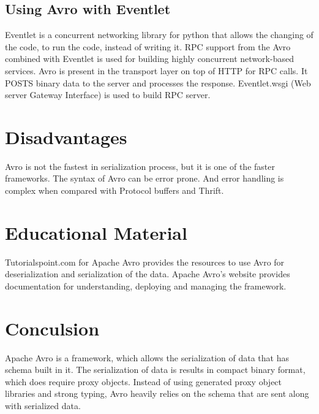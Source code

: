 \documentclass[9pt,twocolumn,twoside]{../../styles/osajnl}
\begin{document}
\subsection{Using Avro with Eventlet}

Eventlet\cite{www-using-avro} is a concurrent networking library for
python that allows the changing of the code, to run the code, instead
of writing it.  RPC support from the Avro combined with Eventlet is
used for building highly concurrent network-based services. Avro is
present in the transport layer on top of HTTP for RPC calls. It POSTS
binary data to the server and processes the response. Eventlet.wsgi
(Web server Gateway Interface) is used to build RPC server.

\section{Disadvantages}

Avro is not the fastest in serialization process, but it is one of the
faster frameworks.  The syntax of Avro can be error prone. And error
handling is complex when compared with Protocol buffers and Thrift.

\section{Educational Material}

Tutorialspoint.com \cite{www-tutorialspoint-avro}for Apache Avro
provides the resources to use Avro for deserialization and
serialization of the data.  Apache Avro’s \cite{www-apache-avro}
website provides documentation for understanding, deploying and
managing the framework.

\section{Conculsion}

Apache Avro is a framework, which allows the serialization of data
that has schema built in it. The serialization of data is results in
compact binary format, which does require proxy objects. Instead of
using generated proxy object libraries and strong typing, Avro heavily
relies on the schema that are sent along with serialized data.


\end{document}

